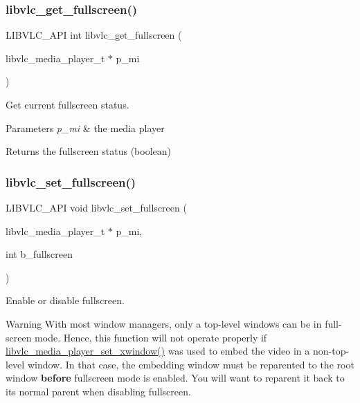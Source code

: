 \subsubsection{\texorpdfstring{libvlc\+\_\+get\+\_\+fullscreen()}{libvlc\_get\_fullscreen()}}
{\footnotesize\ttfamily L\+I\+B\+V\+L\+C\+\_\+\+A\+PI int libvlc\+\_\+get\+\_\+fullscreen (\begin{DoxyParamCaption}\item[{libvlc\+\_\+media\+\_\+player\+\_\+t $\ast$}]{p\+\_\+mi }\end{DoxyParamCaption})}

Get current fullscreen status.


\begin{DoxyParams}{Parameters}
{\em p\+\_\+mi} & the media player \\
\hline
\end{DoxyParams}
\begin{DoxyReturn}{Returns}
the fullscreen status (boolean)
\end{DoxyReturn}
\mbox{\label{group__libvlc__video_ga26892692dcb079743c9c7e0df3308ea4}} 
\subsubsection{\texorpdfstring{libvlc\+\_\+set\+\_\+fullscreen()}{libvlc\_set\_fullscreen()}}
{\footnotesize\ttfamily L\+I\+B\+V\+L\+C\+\_\+\+A\+PI void libvlc\+\_\+set\+\_\+fullscreen (\begin{DoxyParamCaption}\item[{libvlc\+\_\+media\+\_\+player\+\_\+t $\ast$}]{p\+\_\+mi,  }\item[{int}]{b\+\_\+fullscreen }\end{DoxyParamCaption})}

Enable or disable fullscreen.

\begin{DoxyWarning}{Warning}
With most window managers, only a top-\/level windows can be in full-\/screen mode. Hence, this function will not operate properly if \hyperlink{group__libvlc__media__player_ga31827df3a665a72410cb95695147ba5b}{libvlc\+\_\+media\+\_\+player\+\_\+set\+\_\+xwindow()} was used to embed the video in a non-\/top-\/level window. In that case, the embedding window must be reparented to the root window {\bfseries before} fullscreen mode is enabled. You will want to reparent it back to its normal parent when disabling fullscreen.
\end{DoxyWarning}

